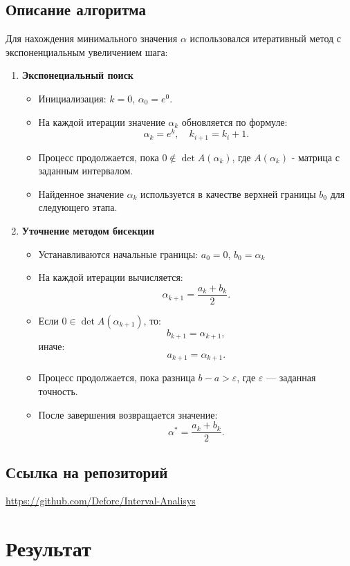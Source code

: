 \documentclass[a4paper,14pt]{article}
\begin{document}
	\subsection{Описание алгоритма}
	Для нахождения минимального значения \(\alpha\) использовался итеративный метод с экспоненциальным увеличением шага:
	\begin{enumerate}
		\item \textbf{Экспонециальный поиск}
		\begin{itemize}
			\item Инициализация: \( k = 0 \), \(\alpha_0 = e^0\).
			\item На каждой итерации значение \( \alpha_k \) обновляется по формуле:
          		\[ \alpha_k = e^k, \quad k_{i+1} = k_{i} + 1. \]
				  \item Процесс продолжается, пока \( 0 \notin \det A(\alpha_k) \), где \( A(\alpha_k) \) - матрица с заданным интервалом.
				  \item Найденное значение \( \alpha_k \) используется в качестве верхней границы \( b_0 \) для следующего этапа.
		\end{itemize}
		\item \textbf{Уточнение методом бисекции}
		\begin{itemize}
			\item Устанавливаются начальные границы: \( a_0 = 0 \), \( b_0 = \alpha_k \)
			\item На каждой итерации вычисляется:
				\[ \alpha_{k+1} = \frac{a_k + b_k}{2}. \]
			\item Если \( 0 \in \det A(\alpha_{k+1}) \), то:
				\[ b_{k+1} = \alpha_{k+1}, \]
			иначе:
				\[ a_{k+1} = \alpha_{k+1}. \]
			\item Процесс продолжается, пока разница \( b - a > \varepsilon \), где \( \varepsilon \) — заданная точность.
			\item После завершения возвращается значение:
				  \[ \alpha^* = \frac{a_k + b_k}{2}. \]	
		\end{itemize}
	\end{enumerate}
	
	\subsection{Ссылка на репозиторий}
	\url{https://github.com/Deforc/Interval-Analisys} 
	
	\clearpage

	\section{Результат}
\end{document}
